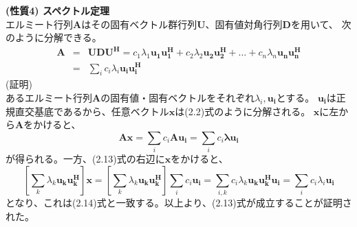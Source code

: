 \vspace{5mm}
\noindent\textbf{(性質4) \quad スペクトル定理} \\
エルミート行列$\bm{A}$はその固有ベクトル群行列$\bm{U}$、固有値対角行列$\bm{D}$を用いて、
次のように分解できる。 \\
\begin{eqnarray}
    \bm{A} &=& \bm{UDU^H} = c_1\lambda_1\bm{u_1u_1^H}+c_2\lambda_2\bm{u_2u_2^H}+\ldots+c_n\lambda_n\bm{u_nu_n^H} \nonumber \\
    &=& \sum_i c_i\lambda_i\bm{u_iu_i^H}
\end{eqnarray}
\vspace{3mm}
(証明) \\
あるエルミート行列$\bm{A}$の固有値・固有ベクトルをそれぞれ$\lambda_i,\bm{u_i}$とする。
$\bm{u_i}$は正規直交基底であるから、任意ベクトル$\bm{x}$は(2.2)式のように分解される。
$\bm{x}$に左から$\bm{A}$をかけると、
\begin{equation}
    \bm{Ax} = \sum_i c_i\bm{Au_i} = \sum_i c_i\bm{\lambda u_i}
\end{equation}
が得られる。一方、(2.13)式の右辺に$\bm{x}$をかけると、
\begin{equation}
    \left[
        \sum_k \lambda_k\bm{u_ku_k^H}
    \right]\bm{x}
    = \left[
        \sum_k \lambda_k\bm{u_ku_k^H}
    \right]\sum_i c_i\bm{u_i}
    = \sum_{i,k} c_i\lambda_k\bm{u_ku_k^Hu_i}
    = \sum_i c_i\lambda_i\bm{u_i} \nonumber
\end{equation}
となり、これは(2.14)式と一致する。以上より、(2.13)式が成立することが証明された。

